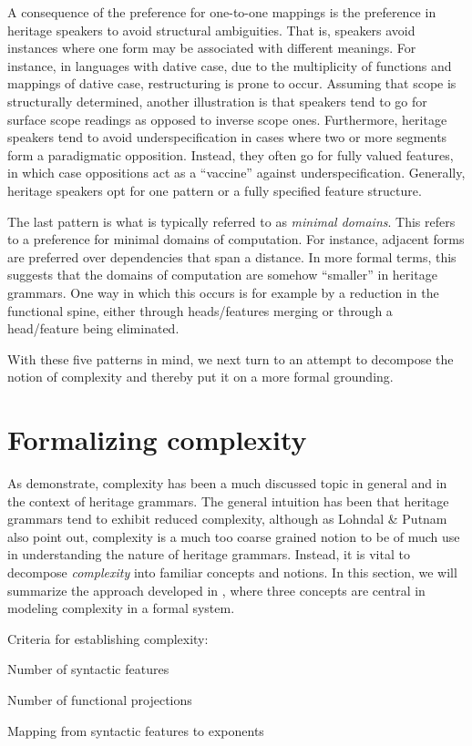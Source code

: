 \documentclass[output=paper,colorlinks,citecolor=brown,footheight=42pt]{langscibook}
\begin{document}
A consequence of the preference for one-to-one mappings is the preference in heritage speakers to avoid structural ambiguities. That is, speakers avoid instances where one form may be associated with different meanings. For instance, in languages with dative case, due to the multiplicity of functions and mappings of dative case, restructuring is prone to occur. Assuming that scope is structurally determined, another illustration is that speakers tend to go for surface scope readings as opposed to inverse scope ones. Furthermore, heritage speakers tend to avoid underspecification in cases where two or more segments form a paradigmatic opposition. Instead, they often go for fully valued features, in which case oppositions act as a “vaccine” against underspecification. Generally, heritage speakers opt for one pattern or a fully specified feature structure.

The last pattern is what is typically referred to as {\itshape minimal domains}. This refers to a preference for minimal domains of computation. For instance, adjacent forms are preferred over dependencies that span a distance. In more formal terms, this suggests that the domains of computation are somehow “smaller” in heritage grammars. One way in which this occurs is for example by a reduction in the functional spine, either through heads/features merging or through a head/feature being eliminated.

With these five patterns in mind, we next turn to an attempt to decompose the notion of complexity and thereby put it on a more formal grounding. 

\section{Formalizing complexity} \label{formalcomplexity}
As \citet{lohnput21} demonstrate, complexity has been a much discussed topic in general and in the context of heritage grammars. The general intuition has been that heritage grammars tend to exhibit reduced complexity, although as Lohndal \& Putnam also point out, complexity is a much too coarse grained notion to be of much use in understanding the nature of heritage grammars. Instead, it is vital to decompose {\itshape complexity} into familiar concepts and notions. In this section, we will summarize the approach developed in \citet{lohnput21}, where three concepts are central in modeling complexity in a formal system.

\begin{exe}
\item Criteria for establishing complexity: \label{criteria}
\begin{xlist}
\item Number of syntactic features
\item Number of functional projections
\item Mapping from syntactic features to exponents
\end{xlist}
\end{exe}
\end{document}
